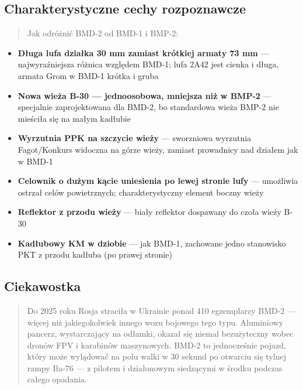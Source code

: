 \documentclass[12pt,oneside]{book}
\providecommand{\tightlist}{%
  \setlength{\itemsep}{0pt}\setlength{\parskip}{0pt}}
\begin{document}
\subsection{Charakterystyczne cechy
rozpoznawcze}\label{charakterystyczne-cechy-rozpoznawcze-8}

\begin{quote}
Jak odróżnić BMD-2 od BMD-1 i BMP-2:
\end{quote}

\begin{itemize}
\tightlist
\item
  \textbf{Długa lufa działka 30 mm zamiast krótkiej armaty 73 mm} ---
  najwyraźniejsza różnica względem BMD-1; lufa 2A42 jest cienka i długa,
  armata Grom w BMD-1 krótka i gruba
\item
  \textbf{Nowa wieża B-30 --- jednoosobowa, mniejsza niż w BMP-2} ---
  specjalnie zaprojektowana dla BMD-2, bo standardowa wieża BMP-2 nie
  mieściła się na małym kadłubie
\item
  \textbf{Wyrzutnia PPK na szczycie wieży} --- sworzniowa wyrzutnia
  Fagot/Konkurs widoczna na górze wieży, zamiast prowadnicy nad działem
  jak w BMD-1
\item
  \textbf{Celownik o dużym kącie uniesienia po lewej stronie lufy} ---
  umożliwia ostrzał celów powietrznych; charakterystyczny element boczny
  wieży
\item
  \textbf{Reflektor z przodu wieży} --- biały reflektor dospawany do
  czoła wieży B-30
\item
  \textbf{Kadłubowy KM w dziobie} --- jak BMD-1, zachowane jedno
  stanowisko PKT z przodu kadłuba (po prawej stronie)
\end{itemize}

\subsection{Ciekawostka}\label{ciekawostka-8}

\begin{quote}
Do 2025 roku Rosja straciła w Ukrainie ponad 410 egzemplarzy BMD-2 ---
więcej niż jakiegokolwiek innego wozu bojowego tego typu. Aluminiowy
pancerz, wystarczający na odłamki, okazał się niemal bezużyteczny wobec
dronów FPV i karabinów maszynowych. BMD-2 to jednocześnie pojazd, który
może wylądować na polu walki w 30 sekund po otwarciu się tylnej rampy
Iła-76 --- z pilotem i działonowym siedzącymi w środku podczas całego
opadania.
\end{quote}
\end{document}
